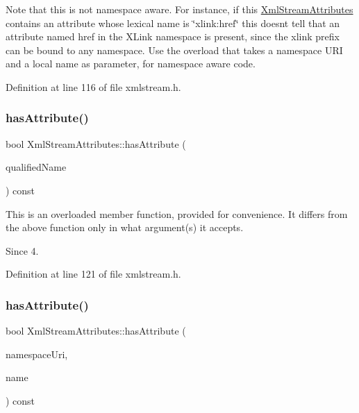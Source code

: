 Note that this is not namespace aware. For instance, if this \hyperlink{class_xml_stream_attributes}{Xml\+Stream\+Attributes} contains an attribute whose lexical name is \char`\"{}xlink\+:href\char`\"{} this doesn\textquotesingle{}t tell that an attribute named {\ttfamily href} in the X\+Link namespace is present, since the {\ttfamily xlink} prefix can be bound to any namespace. Use the overload that takes a namespace U\+RI and a local name as parameter, for namespace aware code. 

Definition at line 116 of file xmlstream.\+h.

\mbox{\label{class_xml_stream_attributes_a78238cc4e8a5e44594cb78d048e18500}} 
\subsubsection{\texorpdfstring{has\+Attribute()}{hasAttribute()}\hspace{0.1cm}{\footnotesize\ttfamily [2/3]}}
{\footnotesize\ttfamily bool Xml\+Stream\+Attributes\+::has\+Attribute (\begin{DoxyParamCaption}\item[{Q\+Latin1\+String}]{qualified\+Name }\end{DoxyParamCaption}) const\hspace{0.3cm}{\ttfamily [inline]}}

This is an overloaded member function, provided for convenience. It differs from the above function only in what argument(s) it accepts. \begin{DoxySince}{Since}
4. 
\end{DoxySince}


Definition at line 121 of file xmlstream.\+h.

\mbox{\label{class_xml_stream_attributes_a86109339929f05fa1b8755f482fd19d9}} 
\subsubsection{\texorpdfstring{has\+Attribute()}{hasAttribute()}\hspace{0.1cm}{\footnotesize\ttfamily [3/3]}}
{\footnotesize\ttfamily bool Xml\+Stream\+Attributes\+::has\+Attribute (\begin{DoxyParamCaption}\item[{const Q\+String \&}]{namespace\+Uri,  }\item[{const Q\+String \&}]{name }\end{DoxyParamCaption}) const\hspace{0.3cm}{\ttfamily [inline]}}

